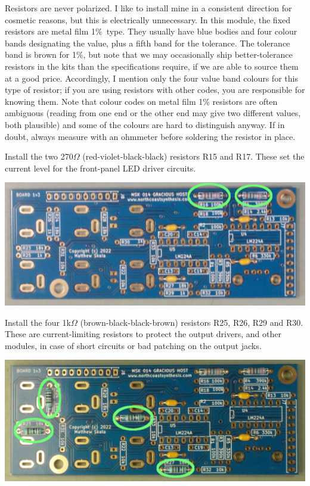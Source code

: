 Resistors are never polarized.  I like to install mine in a consistent
direction for cosmetic reasons, but this is electrically unnecessary.  In
this module, the fixed resistors are metal film 1\%\ type.  They usually
have blue bodies and four colour bands designating the value, plus a fifth
band for the tolerance.  The tolerance band is brown for 1\%, but note that
we may occasionally ship better-tolerance resistors in the kits than the
specifications require, if we are able to source them at a good price. 
Accordingly, I mention only the four value band colours for this type of
resistor; if you are using resistors with other codes, you are responsible
for knowing them.  Note that colour codes on metal film 1\% resistors are
often ambiguous (reading from one end or the other end may give two
different values, both plausible) and some of the colours are hard to
distinguish anyway.  If in doubt, always measure with an ohmmeter before
soldering the resistor in place.

Install the two 270$\Omega$ (red-violet-black-black) resistors R15 and R17. 
These set the current level for the front-panel LED driver circuits.

\nopagebreak
\noindent\includegraphics[width=\linewidth]{res-270.jpg}

Install the four 1k$\Omega$ (brown-black-black-brown) resistors R25, R26,
R29 and R30.  These are current-limiting resistors to protect the output
drivers, and other modules, in case of short circuits or bad patching on the
output jacks.

\nopagebreak
\noindent\includegraphics[width=\linewidth]{res-1k.jpg}

